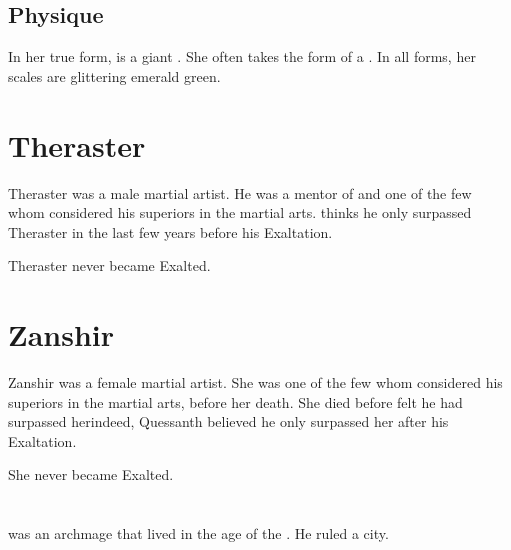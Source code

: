 \subsection{Physique}
In her true form, \Sarokash is a giant \nagalord. 
She often takes the form of a \scatha. 
In all forms, her scales are glittering emerald green. 















\section{Theraster}
Theraster was a male \caisith martial artist. 
He was a mentor of \Quessanth and one of the few whom \Quessanth considered his superiors in the martial arts. 
\Quessanth thinks he only surpassed Theraster in the last few years before his Exaltation.

Theraster never became Exalted.















\section{Zanshir}
Zanshir was a female \caisith martial artist. 
She was one of the few whom \Quessanth considered his superiors in the martial arts, before her death. 
She died before \Quessanth felt he had surpassed her\dash indeed, Quessanth believed he only surpassed her after his Exaltation.

She never became Exalted.
















\section{\ZeethanKraal}
\index{\ZeethanKraal}
\ZeethanKraal was an \ophidian archmage that lived in the age of the \thirdbanewar. 
He ruled a city. 

